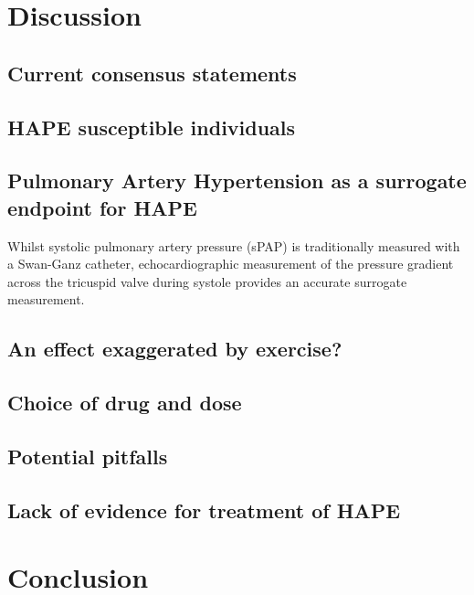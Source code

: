 \documentclass[10pt,a4paper]{article}
\begin{document}
\section*{Discussion}

\subsection*{Current consensus statements}

\subsection*{HAPE susceptible individuals}


\subsection*{Pulmonary Artery Hypertension as a surrogate endpoint for HAPE}

Whilst systolic pulmonary artery pressure (sPAP) is traditionally measured with a Swan-Ganz catheter, echocardiographic measurement of the pressure gradient across the tricuspid valve during systole provides an accurate surrogate measurement.\cite{Tramarin:1991uo,Allemann:2000tc}

\subsection*{An effect exaggerated by exercise?}

\subsection*{Choice of drug and dose}

\subsection*{Potential pitfalls}

\subsection*{Lack of evidence for treatment of HAPE}

\section*{Conclusion}





\end{document}
